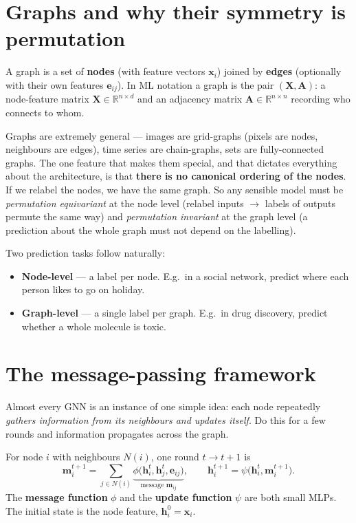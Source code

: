 \documentclass[11pt, oneside]{book}
\newcommand{\R}{\mathbb{R}}
\newcommand{\xvec}{\mathbf{x}}
\newcommand{\hvec}{\mathbf{h}}
\begin{document}
\section{Graphs and why their symmetry is permutation}

A graph is a set of \textbf{nodes} (with feature vectors $\xvec_i$) joined by
\textbf{edges} (optionally with their own features $\mathbf{e}_{ij}$). In ML
notation a graph is the pair $(\mathbf{X},\mathbf{A})$: a node-feature matrix
$\mathbf{X}\in\R^{n\times d}$ and an adjacency matrix $\mathbf{A}\in\R^{n\times n}$
recording who connects to whom.

Graphs are extremely general --- images are grid-graphs (pixels are nodes,
neighbours are edges), time series are chain-graphs, sets are fully-connected
graphs. The one feature that makes them special, and that dictates everything
about the architecture, is that \textbf{there is no canonical ordering of the
nodes}. If we relabel the nodes, we have the same graph. So any sensible model
must be \emph{permutation equivariant} at the node level (relabel inputs $\to$
labels of outputs permute the same way) and \emph{permutation invariant} at the
graph level (a prediction about the whole graph must not depend on the labelling).

Two prediction tasks follow naturally:
\begin{itemize}
  \item \textbf{Node-level} --- a label per node. E.g.\ in a social network,
        predict where each person likes to go on holiday.
  \item \textbf{Graph-level} --- a single label per graph. E.g.\ in drug
        discovery, predict whether a whole molecule is toxic.
\end{itemize}

\section{The message-passing framework}

Almost every GNN is an instance of one simple idea: each node repeatedly
\emph{gathers information from its neighbours and updates itself}. Do this for a
few rounds and information propagates across the graph.

\begin{thmbox}[title={Message-passing neural network (MPNN)}]
For node $i$ with neighbours $N(i)$, one round $t\to t{+}1$ is
\[
  \mathbf{m}_i^{t+1}
    = \sum_{j\in N(i)}
      \underbrace{\phi\bigl(\hvec_i^{t},\hvec_j^{t},\mathbf{e}_{ij}\bigr)}_{\text{message } \mathbf{m}_{ij}},
  \qquad
  \hvec_i^{t+1} = \psi\bigl(\hvec_i^{t},\mathbf{m}_i^{t+1}\bigr).
\]
The \textbf{message function} $\phi$ and the \textbf{update function} $\psi$ are
both small MLPs. The initial state is the node feature, $\hvec_i^{0}=\xvec_i$.
\end{thmbox}
\end{document}
